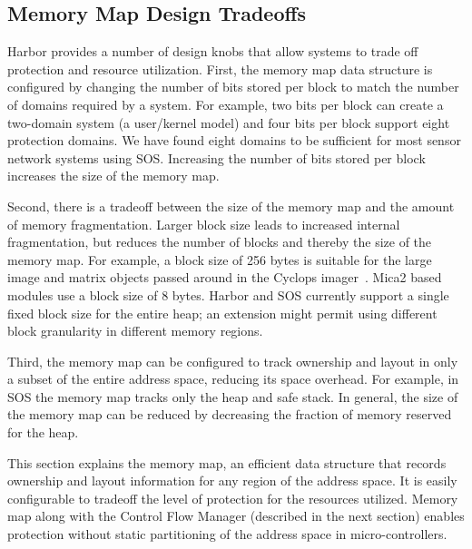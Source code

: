 \subsection{Memory Map Design Tradeoffs}
\label{sec:mmapdesignspace}
%
Harbor provides a number of design knobs that allow systems to trade
off protection and resource utilization.
%
First, the memory map data structure is configured by changing the
number of bits stored per block to match the number of domains
required by a system.
%
For example, two bits per block can create a two-domain system (a user/kernel
model) and four bits per block support eight protection
domains.
%
We have found eight domains to be sufficient for most sensor network
systems using SOS.
%
Increasing the number of bits stored per block increases the size of
the memory map.
%
%
%
%
%

Second, there is a tradeoff between the size of the memory map and the
amount of memory fragmentation.
%
Larger block size leads to increased internal fragmentation, but
reduces the number of blocks and thereby the size of the memory map.
%
For example, a block size of 256 bytes is suitable for the large image
and matrix objects passed around in the Cyclops
imager~\cite{cyclops05sensys}.
%
Mica2 based modules use a block size of 8 bytes.
%
Harbor and SOS currently support a single fixed block size for the
entire heap; an extension might permit using different block
granularity in different memory regions.
%

Third, the memory map can be configured to track ownership and layout
in only a subset of the entire address space, reducing its space
overhead. 
%
%
For example, in SOS the memory map tracks only the heap and safe
stack.
%
%
%
In general, the size of the memory map can be reduced by decreasing
the fraction of memory reserved for the heap.
%
%
%

This section explains the memory map, an efficient data structure that
records ownership and layout information for any region of the address
space.
%
It is easily configurable to tradeoff the level of protection
for the resources utilized.
%
Memory map along with the Control Flow Manager (described in the next
section) enables protection without static partitioning of the address
space in micro-controllers.



